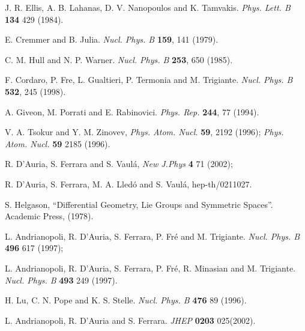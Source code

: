 \documentclass[a4paper,12pt]{article}
\begin{document}
\begin{thebibliography}{99}
J. R. Ellis, A. B. Lahanas, D. V. Nanopoulos and K. Tamvakis. {\it  Phys. Lett. B }
{\bf 134} 429 (1984).

E. Cremmer and B. Julia. {\it Nucl.
Phys. B} {\bf 159}, 141 (1979).


C. M. Hull and N. P. Warner. {\it Nucl.  Phys. B} {\bf 253}, 650
(1985).


F. Cordaro, P. Fre, L. Gualtieri, P. Termonia and M. Trigiante. {\it
Nucl. Phys. B } {\bf 532}, 245 (1998).

A. Giveon, M. Porrati and E. Rabinovici. {\it  Phys. Rep.}  {\bf 244}, 77 (1994).



V. A. Tsokur and Y. M. Zinovev, {\it Phys.  Atom.
Nucl.}  {\bf 59}, 2192 (1996); {\it Phys.  Atom.  Nucl.}
{\bf 59} 2185 (1996).

 R. D'Auria, S. Ferrara and  S. Vaul\'a, {\it New J.Phys} {\bf 4} 71 (2002);

R. D'Auria, S. Ferrara, M. A. Lled\'o  and  S. Vaul\'a,  hep-th/0211027.






 
 S. Helgason, ``Differential Geometry, Lie Groups and Symmetric Spaces''. Academic Press, (1978).


L. Andrianopoli, R. D'Auria, S. Ferrara, P. Fr\'e and M.
Trigiante.
{\it Nucl.  Phys.  B}  {\bf 496} 617 (1997);

L. Andrianopoli, R. D'Auria, S. Ferrara, P. Fr\'e, R. Minasian and
M. Trigiante. {\it Nucl. Phys. B} {\bf 493} 249 (1997).

H. Lu, C. N. Pope and K. S. Stelle. {\it Nucl.  Phys. B} {\bf 476} 89 (1996).

L. Andrianopoli, R. D'Auria and S. Ferrara.
{\it JHEP} {\bf 0203} 025(2002).















\end{thebibliography} 
\end{document}
